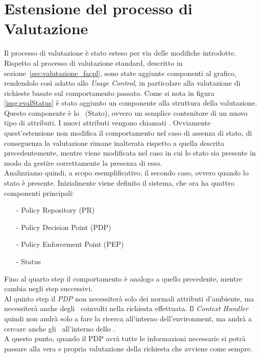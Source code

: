\section{Estensione del processo di Valutazione} %
\label{sec:estensione_del_processo_di_valutazione}
Il processo di valutazione è stato esteso per via delle modifiche introdotte. 
Rispetto al processo di valutazione standard, descritto in sezione~\ref{sec:valutazione_facpl}, sono state aggiunte
componenti al grafico, rendendolo così adatto allo \textit{Usage Control}, in particolare alla valutazione di 
richieste basate sul comportamento passato.
Come si nota in figura \ref{img:evalStatus} è stato aggiunto un componente alla struttura della valutazione.
Questo componente è lo \status \ (Stato), ovvero un semplice contenitore di un nuovo tipo di attributi.
I nuovi attributi vengono chiamati \statusattribute. Ovviamente quest'estensione non modifica il comportamento nel caso di assenza di stato, di conseguenza la valutazione rimane inalterata rispetto a quella descrita precedentemente, mentre viene modificata nel caso in cui lo stato sia presente in modo da gestire correttamente la presenza di esso.\\
Analizziamo quindi, a scopo esemplificativo, il secondo caso, ovvero quando lo stato è presente. Inizialmente viene definito il sistema, che ora ha quattro componenti principali:
\begin{itemize}
	\item[-]{Policy Repository (PR)}
	\item[-]{Policy Decision Point (PDP)}
	\item[-]{Policy Enforcement Point (PEP)}
	\item[-]{Status}
\end{itemize}
Fino al quarto step il comportamento è analogo a quello precedente, mentre cambia negli step successivi.\\
Al quinto step il \textit{PDP} non necessiterà solo dei normali attributi d'ambiente, ma necessiterà anche degli \statusattribute \ coinvolti nella richiesta effettuata. Il \textit{Context Handler} quindi non andrà solo a fare la ricerca all'interno dell'environment, ma andrà a cercare anche gli \statusattribute \ all'interno dello \status.\\
A questo punto, quando il PDP avrà tutte le informazioni necessarie si potrà passare alla vera e propria valutazione della richiesta che avviene come sempre.\\
